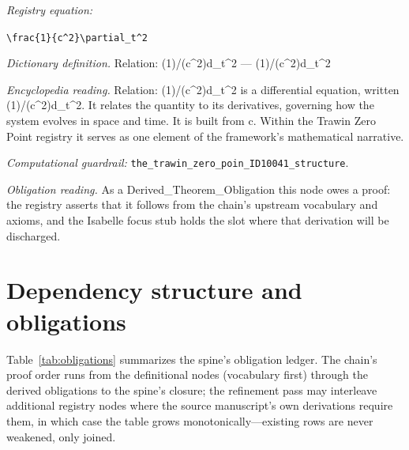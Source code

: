 \documentclass[11pt]{article}
\theoremstyle{remark}
\begin{document}
\noindent\textit{Registry equation:}\par
{\small\texttt{\textbackslash{}frac\{1\}\{c\textasciicircum{}2\}\textbackslash{}partial\_t\textasciicircum{}2}}\par\medskip
\noindent\textit{Dictionary definition.} Relation: (1)/(c\textasciicircum{}2)d\_t\textasciicircum{}2 --- (1)/(c\textasciicircum{}2)d\_t\textasciicircum{}2\par\medskip
\noindent\textit{Encyclopedia reading.} Relation: (1)/(c\textasciicircum{}2)d\_t\textasciicircum{}2 is a differential equation, written (1)/(c\textasciicircum{}2)d\_t\textasciicircum{}2. It relates the quantity to its derivatives, governing how the system evolves in space and time. It is built from c. Within the Trawin Zero Point registry it serves as one element of the framework's mathematical narrative.
\par\medskip\noindent\textit{Computational guardrail:} \texttt{the\_trawin\_zero\_poin\_ID10041\_structure}.
\par\medskip\noindent\textit{Obligation reading.} As a Derived\_Theorem\_Obligation this node owes a proof: the registry asserts that it follows from the chain's upstream vocabulary and axioms, and the Isabelle focus stub holds the slot where that derivation will be discharged.

\section{Dependency structure and obligations}
\label{sec:dep}

Table~\ref{tab:obligations} summarizes the spine's obligation ledger. The chain's proof order runs from the definitional nodes (vocabulary first) through the derived obligations to the spine's closure; the refinement pass may interleave additional registry nodes where the source manuscript's own derivations require them, in which case the table grows monotonically---existing rows are never weakened, only joined.
\end{document}
